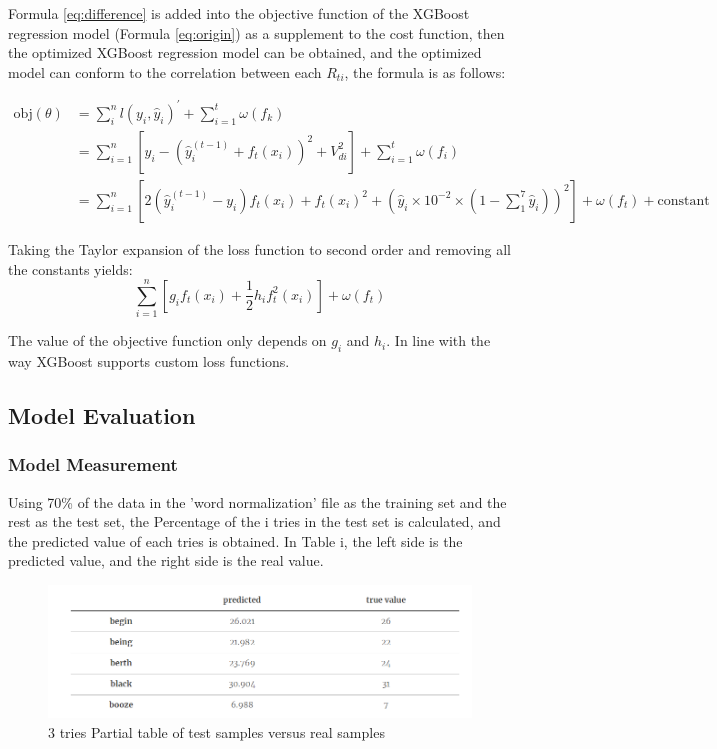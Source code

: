 \documentclass[12pt]{article}  %
\begin{document}
Formula \ref{eq:difference} is added into the objective function of the XGBoost regression model (Formula \ref{eq:origin}) as a supplement to the cost function, then the optimized XGBoost regression model can be obtained, and the optimized model can conform to the correlation between each $R_{ti}$, the formula is as follows:

\begin{equation}
\begin{split}
\text{obj}(\theta) &= \sum_i^n l(y_i, \hat{y}_i)^{'} + \sum_{i=1}^t \omega(f_k)
\\
&= \sum_{i=1}^n [y_i - (\hat{y}_i^{(t-1)} + f_t(x_i))^2+V_{di}^2] + \sum_{i=1}^t\omega(f_i) \\
&=\sum_{i=1}^n [2(\hat{y}_i^{(t-1)} - y_i)f_t(x_i) + f_t(x_i)^2+(\hat{y}_i\times10^{-2}\times(1-{\textstyle \sum_{1}^{7}} \hat{y}_i))^2] + \omega(f_t) + \mathrm{constant}
\end{split}
\end{equation}

Taking the Taylor expansion of the loss function to second order and removing all the constants yields:
\begin{equation}
\sum_{i=1}^n [g_i f_t(x_i) + \frac{1}{2} h_i f_t^2(x_i)] + \omega(f_t)
\end{equation}

The value of the objective function only depends on $g_i$ and $h_i$. In line with the way XGBoost supports custom loss functions.
\subsection{Model Evaluation}\label{evaluation}
\subsubsection{Model Measurement}
Using 70\% of the data in the 'word normalization' file as the training set and the rest as the test set, the Percentage of the i tries in the test set is calculated, and the predicted value of each tries is obtained. In Table i, the left side is the predicted value, and the right side is the real value.

\begin{figure}[htbp]
\centering
\includegraphics[width=.8\textwidth]{img/image.png}
\caption{3 tries Partial table of test samples versus real samples}\label{fig:result}
\end{figure}
\end{document}
